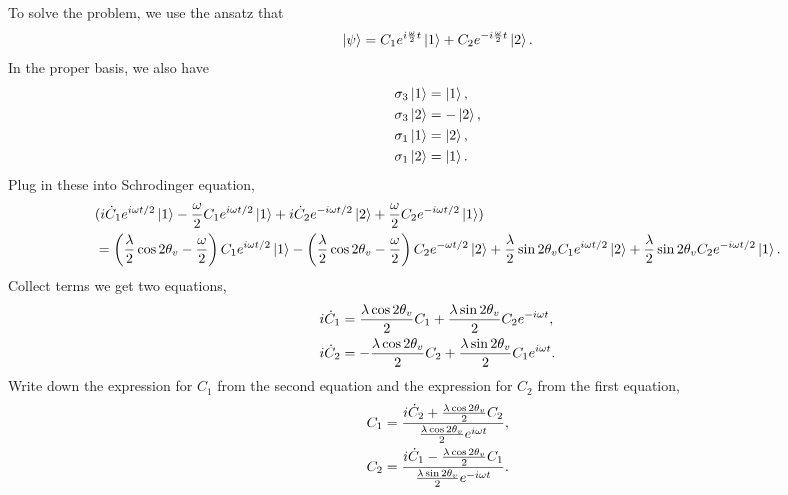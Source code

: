 \documentclass[letterpaper,12pt,english]{sphinxmanual}
\newcommand{\ket}[1]{\left| #1\right\rangle}
\begin{document}
To solve the problem, we use the ansatz that
\begin{gather}
\begin{split}\ket{\psi} = C_1 e^{i\frac{\omega}{2}t} \ket{1} + C_2 e^{-i\frac{\omega}{2}t} \ket{2}.\end{split}\notag
\end{gather}
In the proper basis, we also have
\begin{gather}
\begin{split}\sigma_3 \ket{1} &= \ket{1}, \\
\sigma_3 \ket{2} & = -\ket{2},\\
\sigma_1 \ket{1} & = \ket{2},\\
\sigma_1\ket{2} & = \ket{1}.\end{split}\notag
\end{gather}
Plug in these into Schrodinger equation,
\begin{gather}
\begin{split}&( i\dot C_1 e^{i\omega t/2} \ket{1} - \frac{\omega}{2} C_1 e^{i\omega t/2} \ket{1} + i\dot C_2 e^{-i\omega t/2} \ket{2} + \frac{\omega}{2} C_2 e^{-i\omega t/2} \ket{1} ) \\
&= \left( \frac{\lambda}{2} \cos 2\theta_v - \frac{\omega}{2} \right) C_1 e^{i\omega t/2} \ket{1} - \left( \frac{\lambda}{2}\cos 2\theta_v -\frac{\omega}{2}  \right) C_2 e^{-\omega t/2} \ket{2} + \frac{\lambda}{2} \sin 2\theta_v C_1 e^{i\omega t/2}\ket{2} + \frac{\lambda}{2} \sin 2\theta_v C_2 e^{-i\omega t/2} \ket{1}.\end{split}\notag
\end{gather}
Collect terms we get two equations,
\begin{gather}
\begin{split}i \dot C_1 & = \frac{\lambda \cos 2\theta_v}{2} C_1 + \frac{\lambda \sin 2\theta_v}{2} C_2 e^{-i\omega t}, \\
i \dot C_2 & = -\frac{\lambda \cos 2\theta_v}{2} C_2 + \frac{\lambda \sin 2\theta_v}{2} C_1 e^{i\omega t}.\end{split}\notag
\end{gather}
Write down the expression for \(C_1\) from the second equation and the expression for \(C_2\) from the first equation,
\begin{gather}
\begin{split}C_1 &= \frac{ i \dot C_2 + \frac{\lambda \cos 2\theta_v }{2}C_2 }{\frac{\lambda \cos 2\theta_v}{2} e^{i\omega t}}, \\
C_2 & = \frac{ i \dot C_1 - \frac{\lambda \cos 2\theta_v }{2}C_1  }{ \frac{\lambda \sin 2\theta_v}{2} e^{-i\omega t} }.\end{split}\notag
\end{gather}
\end{document}
